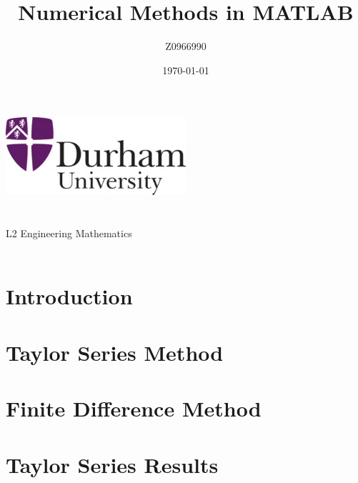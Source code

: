 \documentclass[a4paper,12pt,twocolumn]{article}
\author{Z0966990}
\title{Numerical Methods in MATLAB}
\date{\today}
\begin{document}
    
\begin{titlepage}
    \centering
    \vspace*{\fill}
    \includegraphics[width=0.5\textwidth]{Durham.png}\\
    \vspace*{\fill}
    \LARGE\thetitle\\
    \large\theauthor\\
    \large L2 Engineering Mathematics\\
    \large\thedate\\
    \vspace*{\fill}
\end{titlepage}

\renewcommand{\abstractname}{\large Abstract}
\twocolumn[
\begin{@twocolumnfalse}
    \begin{abstract}
    \end{abstract}
\end{@twocolumnfalse}
\vspace{\parsep}
]


\printnomenclature

\section{Introduction}
\section{Taylor Series Method}
\section{Finite Difference Method}
\section{Taylor Series Results}
\end{document}
